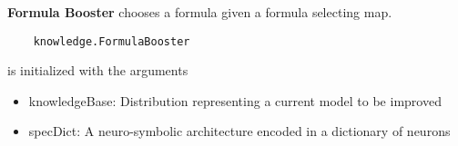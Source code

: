 
\textbf{Formula Booster} chooses a formula given a formula selecting map.
\begin{lstlisting}
	knowledge.FormulaBooster
\end{lstlisting}
is initialized with the arguments
\begin{itemize}
	\item knowledgeBase: Distribution representing a current model to be improved
	\item specDict: A neuro-symbolic architecture encoded in a dictionary of neurons
\end{itemize}


